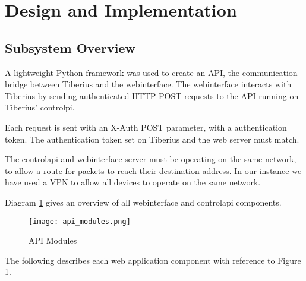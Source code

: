 \section{Design and Implementation}

\subsection{Subsystem Overview}
\label{sec:web_subsystem_overview}
A lightweight Python framework was used to create an API, the communication bridge between Tiberius and the \gls{webinterface}. The \gls{webinterface} interacts with Tiberius by sending authenticated \gls{HTTP} \gls{POST} requests to the \gls{API} running on Tiberius' \gls{controlpi}.

Each request is sent with an X-Auth \gls{POST} parameter, with a authentication token. The authentication token set on Tiberius and the web server must match.

The \gls{controlapi} and \gls{webinterface} server must be operating on the same network, to allow a route for packets to reach their destination address. In our instance we have used a \gls{VPN} to allow all devices to operate on the same network.

Diagram \ref{fig:api-modules} gives an overview of all \gls{webinterface} and \gls{controlapi} components.
\newline

\begin{figure}[!htb]
\begin{center}
\texttt{[image: api\_modules.png]}
\end{center}
\caption{API Modules}
\label{fig:api-modules}
\end{figure}

The following describes each web application component with reference to Figure \ref{fig:api-modules}.

